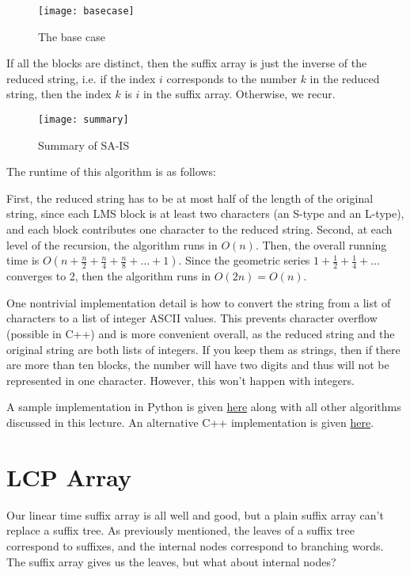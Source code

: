 \documentclass[11pt, oneside]{article}
\begin{document}
\newpage

\begin{figure}[h!]
\centering
\texttt{[image: basecase]}
\caption{The base case}
\end{figure}

If all the blocks are distinct, then the suffix array is just the inverse of
the reduced string, i.e. if the index \( i \) corresponds to the number \( k \)
in the reduced string, then the index \( k \) is \( i \) in the suffix array.
Otherwise, we recur.

\begin{figure}[h!]
\centering
\texttt{[image: summary]}
\caption{Summary of SA-IS}
\end{figure}

The runtime of this algorithm is as follows:

First, the reduced string has to be at most half of the length of the original string,
since each LMS block is at least two characters (an S-type and an L-type), and each block
contributes one character to the reduced string.
Second, at each level of the recursion, the algorithm runs in \( O(n) \).
Then, the overall running time is \( O(n + \frac{n}{2} + \frac{n}{4} + \frac{n}{8} + \dots + 1) \).
Since the geometric series \( 1 + \frac{1}{2} + \frac{1}{4} + \dots \) converges to 2,
then the algorithm runs in \( O(2n) = O(n) \).

One nontrivial implementation detail is how to convert the string from a list of characters
to a list of integer ASCII values. This prevents character overflow (possible in C++)
and is more convenient overall, as the reduced string and the original string are both lists of integers.
If you keep them as strings, then if there are more than ten blocks, the number will have two digits
and thus will not be represented in one character. However, this won't happen with integers.

A sample implementation in Python is given \href{https://gist.github.com/stephen-huan/aa609965c86d750736398c28b025f9be#suffix-array}{here}
along with all other algorithms discussed in this lecture.
An alternative C++ implementation is given \href{https://gist.github.com/stephen-huan/d660e04476f06695663401d0ac01a27a#suffix-array}{here}.

\section{LCP Array}

Our linear time suffix array is all well and good, but a plain suffix array can't replace a suffix tree.
As previously mentioned, the leaves of a suffix tree correspond to suffixes, and the internal nodes correspond to branching words.
The suffix array gives us the leaves, but what about internal nodes?
\end{document}
